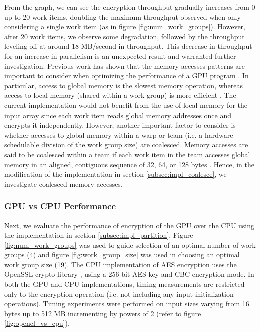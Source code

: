 \documentclass[conference,10pt]{IEEEtran}
\begin{document}
From the graph, we can see the encryption throughput gradually increases from 0 up to 20 work items, 
doubling the maximum throughput observed when only considering a single work item (as in figure 
\ref{fig:num_work_groups}).  However, after 20 work items, we observe some degradation, followed by 
the throughput leveling off at around 18 MB/second in throughput.  This decrease in throughput for 
an increase in parallelism is an unexpected result and warranted further investigation.  Previous 
work has shown that the memory accesses patterns are important to consider when optimizing the 
performance of a GPU program \cite{gpu_mem}. In particular, access to global memory is the slowest 
memory operation, whereas access to local memory (shared within a work group) is more efficient 
\cite{opencl_guide}.  The current implementation would not benefit from the use of local memory for 
the input array since each work item reads global memory addresses once and encrypts it 
independently.  However, another important factor to consider is whether accesses to global memory 
within a warp \cite{gpu_mem} or team \cite{opencl_guide} (i.e. a hardware schedulable division of 
the work group size) are coalesced.  Memory accesses are said to be coalesced within a team if each 
work item in the team accesses global memory in an aligned, contiguous sequence of 32, 64, or 128 
bytes \cite{nvidia_opencl}. Hence, in the modification of the implementation in section 
\ref{subsec:impl_coalesce}, we investigate coalesced memory accesses.  

\subsubsection{GPU vs CPU Performance}
\label{subsec:gpu_vs_cpu}

Next, we evaluate the performance of encryption of the GPU over the CPU using the implementation in 
section \ref{subsec:impl_partition}.   Figure \ref{fig:num_work_groups} was used to guide selection 
of an optimal number of work groups (4) and figure \ref{fig:work_group_size} was used in choosing an 
optimal work group size (19).  The CPU implementation of AES encryption uses the OpenSSL crypto 
library \cite{openssl}, using a 256 bit AES key and CBC encryption mode.  In both the GPU and CPU 
implementations, timing measurements are restricted only to the encryption operation (i.e. not 
including any input initialization operations).  Timing experiments were performed on input sizes 
varying from 16 bytes up to 512 MB incrementing by powers of 2 (refer to figure 
\ref{fig:opencl_vs_cpu}).
\end{document}
